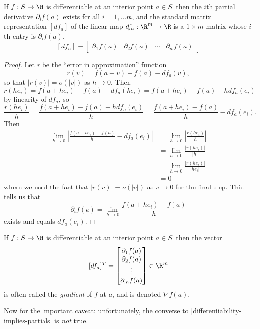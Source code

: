 \begin{lemma} \label{differentiability-implies-partials}
	If $f : S \to \R$ is differentiable at an interior point $a \in S$, then the $i$th partial derivative $\partial_i f(a)$ exists for all $i = 1, \dotsc m$, and the standard matrix representation $[df_a]$ of the linear map $df_a : \R^m \to \R$ is a $1 \times m$ matrix whose $i$th entry is $\partial_i f(a)$. 
	\[ [df_a] = \begin{bmatrix} \partial_1 f(a) & \partial_2 f(a) & \dotsb & \partial_m f(a) \end{bmatrix} \]
\end{lemma}

\begin{proof}
	Let $r$ be the ``error in approximation'' function
	\[ r(v) = f(a+v) - f(a) - df_a(v), \]
	so that $|r(v)| = o(|v|)$ as $h \to 0$. Then
	\[ r(he_i) = f(a+he_i) - f(a) - df_a(he_i) = f(a+he_i) - f(a) - h df_a(e_i) \]
	by linearity of $df_a$, so
	\[ \frac{r(he_i)}{h} = \frac{f(a+he_i) - f(a) - hdf_a(e_i)}{h} = \frac{f(a+he_i) - f(a)}{h} - df_a(e_i). \]
	Then 
	\[ \begin{aligned} \lim_{h \to 0} \left| \frac{f(a+he_i) - f(a)}{h} - df_a(e_i) \right| &= \lim_{h \to 0} \left| \frac{r(he_i)}{h} \right| \\&= \lim_{h \to 0} \frac{|r(he_i)|}{|h|} \\
	&= \lim_{h \to 0} \frac{|r(he_i)|}{|he_i|} \\
	&= 0 \end{aligned} \]
	where we used the fact that $|r(v)| = o(|v|)$ as $v \to 0$ for the final step. This tells us that
	\[ \partial_i f(a) = \lim_{h \to 0} \frac{f(a+he_i) - f(a)}{h} \]
	exists and equals $df_a(e_i)$. 
\end{proof}

\begin{remark} \label{gradient}
	If $f : S \to \R$ is differentiable at an interior point $a \in S$, then the vector \[ [df_a]^T = \begin{bmatrix} \partial_1 f(a) \\ \partial_2 f(a) \\ \vdots \\ \partial_m f(a) \end{bmatrix} \in \R^m \]
	is often called the \emph{gradient} of $f$ at $a$, and is denoted $\nabla f(a)$. 
\end{remark}

Now for the important caveat: unfortunately, the converse to \cref{differentiability-implies-partials} is \emph{not} true. 

